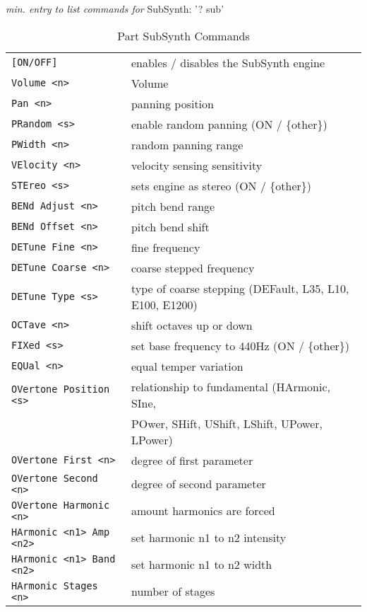    \textsl{min. entry to list commands for} SubSynth: '? sub'
   \begin{table}[H]
      \centering
      \caption{Part SubSynth Commands}
      \label{table:yoshimi_part_subsynth_commands}
      \begin{tabular}{l l}
\texttt{[ON/OFF]} &
   enables / disables the SubSynth engine \\
\texttt{Volume <n>} &
   Volume \\
\texttt{Pan <n>} &
   panning position \\
\texttt{PRandom <s>} &
   enable random panning (ON / \{other\}) \\
\texttt{PWidth <n>} &
   random panning range\\
\texttt{VElocity <n>} &
   velocity sensing sensitivity \\
\texttt{STEreo <s>} &
   sets engine as stereo (ON / \{other\}) \\
\texttt{BENd Adjust <n>} &
   pitch bend range \\
\texttt{BENd Offset <n>} &
   pitch bend shift \\
\texttt{DETune Fine <n>} &
   fine frequency \\
\texttt{DETune Coarse <n>} &
   coarse stepped frequency \\
\texttt{DETune Type <s>} &
   type of coarse stepping (DEFault, L35, L10, E100, E1200) \\
\texttt{OCTave <n>} &
   shift octaves up or down \\
\texttt{FIXed <s>} &
   set base frequency to 440Hz (ON / \{other\}) \\
\texttt{EQUal <n>} &
   equal temper variation \\
\texttt{OVertone Position <s>} &
   relationship to fundamental (HArmonic, SIne,\\
\texttt{} &
   POwer, SHift, UShift, LShift, UPower, LPower)\\
\texttt{OVertone First <n>} &
   degree of first parameter \\
\texttt{OVertone Second <n>} &
   degree of second parameter \\
\texttt{OVertone Harmonic <n>} &
   amount harmonics are forced  \\
\texttt{HArmonic <n1> Amp <n2>} &
   set harmonic n1 to n2 intensity \\
\texttt{HArmonic <n1> Band <n2>} &
   set harmonic n1 to n2 width \\
\texttt{HArmonic Stages <n>} &
   number of stages \\

\end{tabular}
\end{table}
